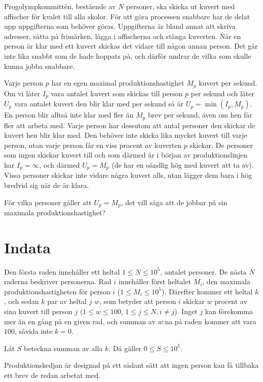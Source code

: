 Progolympkommittén, bestående av $N$ personer, ska skicka ut kuvert med affischer för kvalet till alla skolor.
För att göra processen snabbare har de delat upp uppgifterna som behöver göras.
Uppgifterna är bland annat att skriva adresser, sätta på frimärken, lägga i affischerna och stänga kuverten.
När en person är klar med ett kuvert skickas det vidare till någon annan person.
Det går inte lika snabbt som de hade hoppats på, och därför undrar de vilka som skulle kunna jobba snabbare.

Varje person $p$ har en egen maximal produktionshastighet $M_p$ kuvert per sekund.
Om vi låter $I_p$ vara antalet kuvert som skickas till person $p$ per sekund och låter $U_p$ vara antalet kuvert den blir klar med per sekund så är $U_p = \min(I_p, M_p)$.
En person blir alltså inte klar med fler än $M_p$ brev per sekund, även om hen får fler att arbeta med.
Varje person har dessutom att antal personer den skickar de kuvert hen blir klar med.
Den behöver inte skicka lika mycket kuvert till varje person, utan varje person får en viss procent av kuverten $p$ skickar.
De personer som ingen skickar kuvert till och som därmed är i början av produktionslinjen har $I_p = \infty$, och därmed $U_p = M_p$ (de har en oändlig hög med kuvert att ta av).
Vissa personer skickar inte vidare några kuvert alls, utan lägger dem bara i hög bredvid sig när de är klara.

För vilka personer gäller att $U_p = M_p$, det vill säga att de jobbar på sin maximala produktionshastighet?

\section*{Indata}
Den första raden innehåller ett heltal $1 \le N \le 10^5$, antalet personer.
De nästa $N$ raderna beskriver personerna. Rad $i$ innehåller först heltalet $M_i$, den maximala produktionshastigheten för person $i$ ($1 \le M_i \le 10^5$).
Därefter kommer ett heltal $k$, och sedan $k$ par av heltal $j$ $w$, som betyder att person $i$ skickar $w$ procent av sina kuvert till person $j$ ($1 \le w \le 100$, $1 \le j \le N, i \neq j$).
Inget $j$ kan förekomma mer än en gång på en given rad, och summan av $w$:na på raden kommer att vara $100$, såvida inte $k = 0$.

Låt $S$ beteckna summan av alla $k$. Då gäller $0 \le S \le 10^5$.

Produktionskedjan är designad på ett sådant sätt att ingen person kan få tillbaka ett brev de redan arbetat med.

